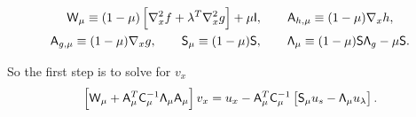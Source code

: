 \begin{gather*}
	\mathsf{W}_{\mu} \equiv (1-\mu) \left[\nabla_x^2 f + \lambda^T \nabla_x^2 g\right] + \mu \mathsf{I},\qquad
	\mathsf{A}_{h, \mu} \equiv (1-\mu) \nabla_x h, \\
	\mathsf{A}_{g, \mu} \equiv (1-\mu) \nabla_x g, \qquad 
	\mathsf{S}_{\mu} \equiv (1-\mu)\mathsf{S},\qquad
	\mathsf{\Lambda}_\mu \equiv (1-\mu) \mathsf{S} \mathsf{\Lambda}_g - \mu \mathsf{S}. 
\end{gather*}


%
%

So the first step is to solve for $v_x$
\begin{equation}\label{eq:schur}
\left[\mathsf{W}_\mu + \mathsf{A}_\mu^T \mathsf{C}_\mu^{-1} \mathsf{\Lambda}_\mu \mathsf{A}_\mu
  \right] v_x = u_x - \mathsf{A}_\mu^T \mathsf{C}_{\mu}^{-1} \left[  \mathsf{S}_\mu  u_s -
  \mathsf{\Lambda}_\mu u_\lambda \right].
\end{equation}


